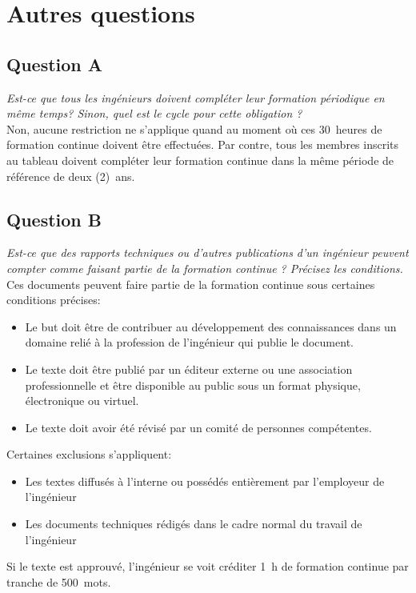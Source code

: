 \section{Autres questions}
	\subsection{Question A}
	\emph{Est-ce que tous les ingénieurs doivent compléter leur formation périodique en même temps? Sinon, quel est le cycle pour cette obligation ?} \\
	
	Non, aucune restriction ne s’applique quand au moment où ces 30~heures de formation continue doivent être effectuées. Par contre, tous les membres inscrits au tableau doivent compléter leur formation continue dans la même période de référence de deux (2)~ans. 
	
	\subsection{Question B}
	\emph{Est-ce que des rapports techniques ou d’autres publications d’un ingénieur peuvent compter comme faisant partie de la formation continue ? Précisez les conditions.} \\
	
	Ces documents peuvent faire partie de la formation continue sous certaines conditions précises:
	\begin{itemize}
		\item Le but doit être de contribuer au développement des connaissances dans un domaine relié à la profession de l’ingénieur qui publie le document.
		\item Le texte doit être publié par un éditeur externe ou une association professionnelle et être disponible au public sous un format physique, électronique ou virtuel.
		\item Le texte doit avoir été révisé par un comité de personnes compétentes.
	\end{itemize}

	Certaines exclusions s’appliquent:
	\begin{itemize}
		\item Les textes diffusés à l’interne ou possédés entièrement par l’employeur de l’ingénieur
		\item Les documents techniques rédigés dans le cadre normal du travail de l’ingénieur
	\end{itemize}

	Si le texte est approuvé, l’ingénieur se voit créditer \SI{1}{h} de formation continue par tranche de 500~mots.

